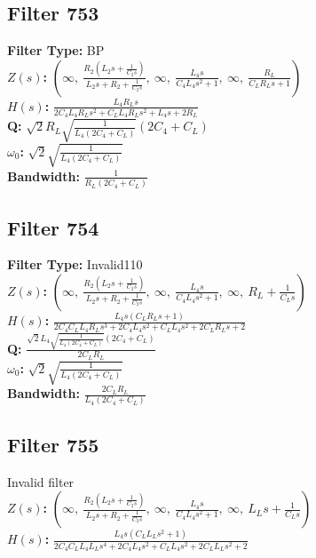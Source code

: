 \documentclass{article}
\begin{document}
\subsection*{Filter 753}
\textbf{Filter Type:} BP \\ 
\textbf{$Z(s)$:} $\left( \infty, \  \frac{R_{2} \left(L_{2} s + \frac{1}{C_{2} s}\right)}{L_{2} s + R_{2} + \frac{1}{C_{2} s}}, \  \infty, \  \frac{L_{4} s}{C_{4} L_{4} s^{2} + 1}, \  \infty, \  \frac{R_{L}}{C_{L} R_{L} s + 1}\right)$ \\ 
\textbf{$H(s)$:} $\frac{L_{4} R_{L} s}{2 C_{4} L_{4} R_{L} s^{2} + C_{L} L_{4} R_{L} s^{2} + L_{4} s + 2 R_{L}}$ \\ 
\textbf{Q:} $\sqrt{2} R_{L} \sqrt{\frac{1}{L_{4} \left(2 C_{4} + C_{L}\right)}} \left(2 C_{4} + C_{L}\right)$ \\ 
\textbf{$\omega_0$:} $\sqrt{2} \sqrt{\frac{1}{L_{4} \left(2 C_{4} + C_{L}\right)}}$ \\ 
\textbf{Bandwidth:} $\frac{1}{R_{L} \left(2 C_{4} + C_{L}\right)}$ \\ 
\subsection*{Filter 754}
\textbf{Filter Type:} Invalid110 \\ 
\textbf{$Z(s)$:} $\left( \infty, \  \frac{R_{2} \left(L_{2} s + \frac{1}{C_{2} s}\right)}{L_{2} s + R_{2} + \frac{1}{C_{2} s}}, \  \infty, \  \frac{L_{4} s}{C_{4} L_{4} s^{2} + 1}, \  \infty, \  R_{L} + \frac{1}{C_{L} s}\right)$ \\ 
\textbf{$H(s)$:} $\frac{L_{4} s \left(C_{L} R_{L} s + 1\right)}{2 C_{4} C_{L} L_{4} R_{L} s^{3} + 2 C_{4} L_{4} s^{2} + C_{L} L_{4} s^{2} + 2 C_{L} R_{L} s + 2}$ \\ 
\textbf{Q:} $\frac{\sqrt{2} L_{4} \sqrt{\frac{1}{L_{4} \left(2 C_{4} + C_{L}\right)}} \left(2 C_{4} + C_{L}\right)}{2 C_{L} R_{L}}$ \\ 
\textbf{$\omega_0$:} $\sqrt{2} \sqrt{\frac{1}{L_{4} \left(2 C_{4} + C_{L}\right)}}$ \\ 
\textbf{Bandwidth:} $\frac{2 C_{L} R_{L}}{L_{4} \left(2 C_{4} + C_{L}\right)}$ \\ 
\subsection*{Filter 755}
Invalid filter \\ 
\textbf{$Z(s)$:} $\left( \infty, \  \frac{R_{2} \left(L_{2} s + \frac{1}{C_{2} s}\right)}{L_{2} s + R_{2} + \frac{1}{C_{2} s}}, \  \infty, \  \frac{L_{4} s}{C_{4} L_{4} s^{2} + 1}, \  \infty, \  L_{L} s + \frac{1}{C_{L} s}\right)$ \\ 
\textbf{$H(s)$:} $\frac{L_{4} s \left(C_{L} L_{L} s^{2} + 1\right)}{2 C_{4} C_{L} L_{4} L_{L} s^{4} + 2 C_{4} L_{4} s^{2} + C_{L} L_{4} s^{2} + 2 C_{L} L_{L} s^{2} + 2}$ \\ 
\end{document}
